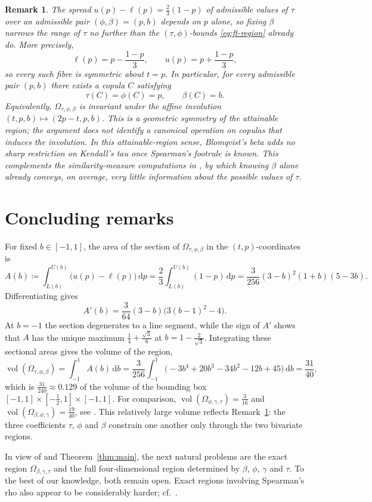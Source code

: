 \documentclass{article}
\newtheorem{remark}[theorem]{Remark}
\newcommand{\de}{\,\mathrm{d}}
\newcommand{\Om}{\Omega_{\tau,\phi,\beta}}
\begin{document}
\begin{remark}\label{rem:fibre}
The spread $u(p)-\ell(p)=\frac23(1-p)$ of admissible values of $\tau$ over an admissible pair $(\phi,\beta)=(p,b)$ depends on $p$ alone, so fixing $\beta$ narrows the range of $\tau$ no further than the $(\tau,\phi)$-bounds \eqref{eq:ft-region} already do.
More precisely,
\[
\ell(p)=p-\frac{1-p}{3},\qquad
u(p)=p+\frac{1-p}{3},
\]
so every such fibre is symmetric about $t=p$.
In particular, for every admissible pair $(p,b)$ there exists a copula $C$ satisfying
\[
\tau(C)=\phi(C)=p,\qquad \beta(C)=b.
\]
Equivalently, $\Om$ is invariant under the affine involution $(t,p,b)\mapsto(2p-t,p,b)$.
This is a geometric symmetry of the attainable region; the argument does not identify a canonical operation on copulas that induces the involution.
In this attainable-region sense, Blomqvist's beta adds no sharp restriction on Kendall's tau once Spearman's footrule is known.
This complements the similarity-measure computations in \cite[Sec.~5]{kokolbukovsek2023exact}, by which knowing $\beta$ alone already conveys, on average, very little information about the possible values of $\tau$.
\end{remark}

\section{Concluding remarks}\label{sec:conclusion}

For fixed $b\in[-1,1]$, the area of the section of $\Om$ in the $(t,p)$-coordinates is
\[
A(b)
\coloneqq \int_{L(b)}^{U(b)}\bigl(u(p)-\ell(p)\bigr)\de p
=\frac23\int_{L(b)}^{U(b)}(1-p)\de p
  =\frac{3}{256}(3-b)^2(1+b)(5-3b).
\]
Differentiating gives
\[
A'(b)=\frac{3}{64}(3-b)\bigl(3(b-1)^2-4\bigr).
\]
At $b=-1$ the section degenerates to a line segment, while the sign of $A'$ shows that $A$ has the unique maximum $\frac14+\frac{\sqrt3}{6}$ at $b=1-\frac{2}{\sqrt3}$.
Integrating these sectional areas gives the volume of the region,
\[
\operatorname{vol}(\Om)
=\int_{-1}^{1}A(b)\de b
=\frac{3}{256}\int_{-1}^{1}
\bigl(-3b^4+20b^3-34b^2-12b+45\bigr)\de b
=\frac{31}{40},
\]
which is $\frac{31}{240}\approx0.129$ of the volume of the bounding box $[-1,1]\times[-\frac12,1]\times[-1,1]$.
For comparison, $\operatorname{vol}(\Omega_{\phi,\gamma,\tau})=\frac{3}{16}$ and $\operatorname{vol}(\Omega_{\beta,\phi,\gamma})=\frac{19}{40}$, see \cite{kokolbukovsek2026footrule,kokolbukovsek2026exact}.
This relatively large volume reflects Remark~\ref{rem:fibre}: the three coefficients $\tau$, $\phi$ and $\beta$ constrain one another only through the two bivariate regions.

In view of \cite{kokolbukovsek2026exact,kokolbukovsek2026footrule} and Theorem~\ref{thm:main}, the next natural problems are the exact region $\Omega_{\beta,\gamma,\tau}$ and the full four-dimensional region determined by $\beta$, $\phi$, $\gamma$ and $\tau$.
To the best of our knowledge, both remain open.
Exact regions involving Spearman's rho also appear to be considerably harder; cf.~\cite{schreyer2017exact,kokolbukovsek2024rhofootrule,tschimpke2025revisiting}.



\end{document}
